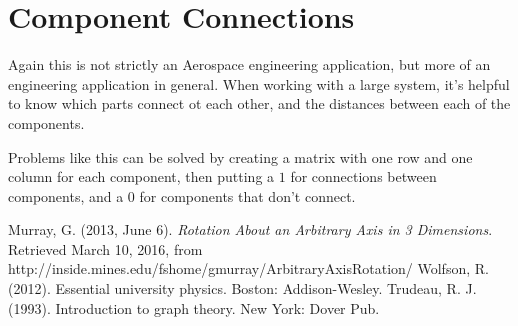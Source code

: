 \documentclass[10pt,letterpaper]{article}
\begin{document}
	\section*{Component Connections}
	
	Again this is not strictly an Aerospace engineering application, but more of an engineering application in general. When working with a large system, it's helpful to know which parts connect ot each other, and the distances between each of the components. 
	
	Problems like this can be solved by creating a matrix with one row and one column for each component, then putting a $1$ for connections between components, and a $0$ for components that don't connect. \cite{Graph}

	
	\begin{thebibliography}{9}
		Murray, G. (2013, June 6). \textit{Rotation About an Arbitrary Axis in 3 Dimensions}. Retrieved March 10, 2016, from http://inside.mines.edu/fshome/gmurray/ArbitraryAxisRotation/
		Wolfson, R. (2012). Essential university physics. Boston: Addison-Wesley.
		Trudeau, R. J. (1993). Introduction to graph theory. New York: Dover Pub.
	\end{thebibliography}
\end{document}
